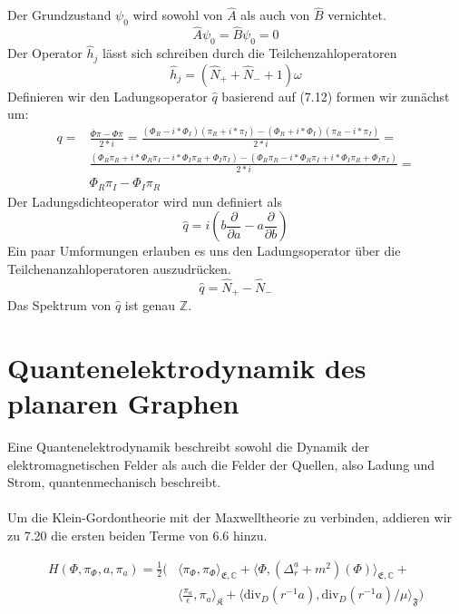 \documentclass[11pt,a4paper,leqno]{report}
\numberwithin{equation}{chapter}
\begin{document}
Der Grundzustand $\psi_0$ wird sowohl von $\hat{A}$ als auch von $\hat{B}$ vernichtet. 
\begin{equation*}
	\hat{A}\psi_0 = \hat{B}\psi_0 = 0
\end{equation*}
Der Operator $\hat{h}_j$ l\"asst sich schreiben durch die Teilchenzahloperatoren
\begin{equation*}
	\hat{h}_j = (\hat{N}_+ +\hat{N}_- + 1)\omega
\end{equation*}
Definieren wir den Ladungsoperator $\hat{q}$ basierend auf (7.12) formen wir zun\"achst um:
\begin{align*}
	q=&\frac{\overline{\Phi}\pi - \Phi\overline{\pi}}{2*i}=
	\frac{(\Phi_R - i*\Phi_I)(\pi_R + i * \pi_I) - (\Phi_R + i*\Phi_I)(\pi_R - i * \pi_I)}{2*i}=\\
	&\frac{(\Phi_R\pi_R+i * \Phi_R\pi_I- i*\Phi_I\pi_R+\Phi_I\pi_I)-
	 (\Phi_R\pi_R-i * \Phi_R\pi_I+ i*\Phi_I\pi_R+\Phi_I\pi_I)}{2*i}=\\
 	&\Phi_R\pi_I-\Phi_I\pi_R
\end{align*} 
Der Ladungsdichteoperator wird nun definiert als 
\begin{equation}
	\hat{q}=i(b\frac{\partial}{\partial a}- a\frac{\partial}{\partial b})
\end{equation}
Ein paar Umformungen erlauben es uns den Ladungsoperator \"uber die Teilchenanzahloperatoren auszudr\"ucken.
\begin{equation*}
	\hat{q} = \hat{N}_+ -\hat{N}_- 
\end{equation*}
Das Spektrum von $\hat{q}$ ist genau $\mathbb{Z}$.
\chapter{Quantenelektrodynamik des planaren Graphen}
Eine Quantenelektrodynamik beschreibt sowohl die Dynamik der elektromagnetischen Felder als auch die Felder der Quellen, also Ladung und Strom, quantenmechanisch beschreibt.\\
\\ 
Um die Klein-Gordontheorie mit der Maxwelltheorie zu verbinden, addieren wir zu 7.20 die ersten beiden Terme von 6.6 hinzu.

\begin{align*}
	H(\Phi, \pi_\Phi, a, \pi_a) = \frac{1}{2}(&\langle \pi_\Phi, \pi_\Phi\rangle_{\mathfrak{E},\mathbb{C}}+\langle \Phi, (\Delta_r^a + m^2)(\Phi)\rangle_{\mathfrak{E},\mathbb{C}}+\\ &\langle \frac{\pi_a}{\epsilon}, \pi_a\rangle_{\mathfrak{K}} + \langle \text{div}_D(r^{-1}a), \text{div}_D(r^{-1}a)/\mu\rangle_{\mathfrak{F}}) 
\end{align*}	
\end{document}
